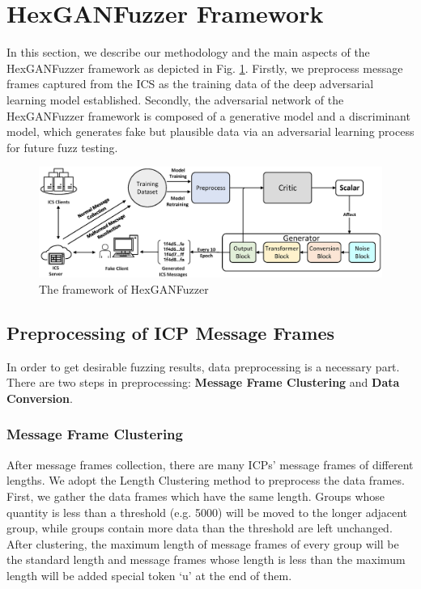 \section{HexGANFuzzer Framework}
In this section, we describe our methodology and the main aspects of the HexGANFuzzer framework as depicted in Fig. \ref{FigHexGANFuzzer_model}. Firstly, we preprocess message frames captured from the ICS as the training data of the deep adversarial learning model established. Secondly, 
the adversarial network of the HexGANFuzzer framework is composed of 
a generative model and a discriminant model, which generates fake but plausible data via an adversarial learning process for future fuzz testing. %

 
\begin{figure}[htbp]   %
	\centering 
	\includegraphics[width=\textwidth]{Figure/FigHexGANFuzzer_model.eps}
	\caption{The framework of HexGANFuzzer}
	\label{FigHexGANFuzzer_model}
\end{figure}

\subsection{Preprocessing of ICP Message Frames}
In order to get desirable fuzzing results, data preprocessing is a necessary part. There are two steps in preprocessing: \textbf{Message Frame Clustering} and \textbf{Data Conversion}.

\subsubsection{\textbf{Message Frame Clustering}}
After message frames collection, there are many ICPs' message frames of different lengths. We adopt the Length Clustering method to preprocess the data frames. %
First, we gather the data frames which have the same length. %
Groups whose quantity is less than a threshold (e.g. 5000) will be moved to the longer adjacent group, while groups contain more data than the threshold are left unchanged.  %
After clustering, the maximum length of message frames of every group will be the standard length and message frames whose length is less than the maximum length will be added special token `u' at the end of them.

